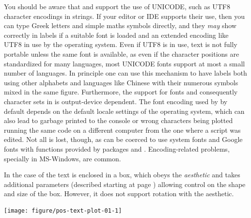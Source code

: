 \documentclass[krantz2]{krantz}\usepackage{knitr}%
\begin{document}
\begin{warningbox}
You should be aware that \Rlang and \ggplot support the use of UNICODE, such as UTF8 character encodings in strings. If your editor or IDE supports their use, then you can type Greek letters and simple maths symbols directly, and they \emph{may} show correctly in labels if a suitable font is loaded and an extended encoding like UTF8 in use by the operating system. Even if UTF8 is in use, text is not fully portable unless the same font is available, as even if the character positions are standardized for many languages, most UNICODE fonts support at most a small number of languages. In principle one can use this mechanism to have labels both using other alphabets and languages like Chinese with their numerous symbols mixed in the same figure. Furthermore, the support for fonts and consequently character sets in \Rlang is output-device dependent. The font encoding used by \Rlang by default depends on the default locale settings of the operating system, which can also lead to garbage printed to the console or wrong characters being plotted running the same code on a different computer from the one where a script was edited. Not all is lost, though, as \Rlang can be coerced to use system fonts and Google fonts with functions provided by packages  and . Encoding-related problems, specially in MS-Windows, are common.
\end{warningbox}

In the case of  the text is enclosed in a box, which obeys the  \emph{aesthetic} and takes additional parameters (described starting at page \pageref{start:plot:label}) allowing control on the shape and size of the box. However, it does not support rotation with the  aesthetic.

\begin{knitrout}\footnotesize
{}\color{fgcolor}\begin{kframe}
\begin{alltt}
\hlstd{(}  \hlstd{(}   
                           \hlstd{=} 
                           
                            \hlopt{+}
  \hlstd{()} \hlopt{+}
  \hlstd{()} \hlopt{+}
  \hlstd{(} \hlstd{=} \hlstd{,}  \hlstd{=} \hlstd{)}
\end{alltt}
\end{kframe}

{\centering \texttt{[image: figure/pos-text-plot-01-1]} 

}



\end{knitrout}
\end{document}
